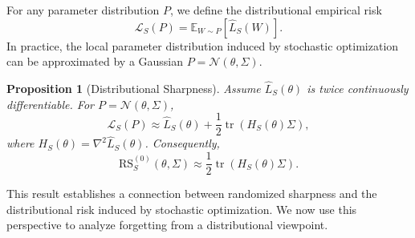 \documentclass{article}
\newtheorem{proposition}{Proposition}
\newtheorem{definition}{Definition}  %
\begin{document}
For any parameter distribution $P$, we define the distributional empirical risk
\[
\mathcal L_S(P)
=
\mathbb E_{W\sim P}[\hat L_S(W)] .
\]
In practice, the local parameter distribution induced by stochastic optimization can be approximated by a Gaussian $P=\mathcal N(\theta,\Sigma)$.

\begin{proposition}[Distributional Sharpness]
Assume $\hat L_S(\theta)$ is twice continuously differentiable. 
For $P=\mathcal N(\theta,\Sigma)$,
\[
\mathcal L_S(P)
\approx
\hat L_S(\theta)
+
\frac12 \operatorname{tr}(H_S(\theta)\Sigma),
\]
where $H_S(\theta)=\nabla^2 \hat L_S(\theta)$. 
Consequently,
\[
\mathrm{RS}_S^{(0)}(\theta,\Sigma)
\approx
\frac12 \operatorname{tr}(H_S(\theta)\Sigma).
\]
\end{proposition}

This result establishes a connection between randomized sharpness and the distributional risk induced by stochastic optimization. 
We now use this perspective to analyze forgetting from a distributional viewpoint.
















\end{document}
